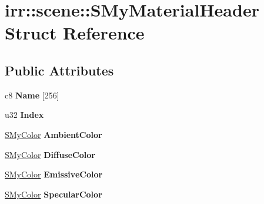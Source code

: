 \hypertarget{structirr_1_1scene_1_1_s_my_material_header}{\section{irr\-:\-:scene\-:\-:S\-My\-Material\-Header Struct Reference}
\label{structirr_1_1scene_1_1_s_my_material_header}
}
\subsection*{Public Attributes}
\begin{DoxyCompactItemize}
\item 
\hypertarget{structirr_1_1scene_1_1_s_my_material_header_a118c00037689ec6e128f6f5f6ae2c58d}{c8 {\bfseries Name} \mbox{[}256\mbox{]}}\label{structirr_1_1scene_1_1_s_my_material_header_a118c00037689ec6e128f6f5f6ae2c58d}

\item 
\hypertarget{structirr_1_1scene_1_1_s_my_material_header_aebd3865f16149fb091ae63b93d45b1d8}{u32 {\bfseries Index}}\label{structirr_1_1scene_1_1_s_my_material_header_aebd3865f16149fb091ae63b93d45b1d8}

\item 
\hypertarget{structirr_1_1scene_1_1_s_my_material_header_a217248cb0b98933ac4f79238ac8e8871}{\hyperlink{structirr_1_1scene_1_1_s_my_color}{S\-My\-Color} {\bfseries Ambient\-Color}}\label{structirr_1_1scene_1_1_s_my_material_header_a217248cb0b98933ac4f79238ac8e8871}

\item 
\hypertarget{structirr_1_1scene_1_1_s_my_material_header_a74aa495ed29826a57cb4cf760290e1b2}{\hyperlink{structirr_1_1scene_1_1_s_my_color}{S\-My\-Color} {\bfseries Diffuse\-Color}}\label{structirr_1_1scene_1_1_s_my_material_header_a74aa495ed29826a57cb4cf760290e1b2}

\item 
\hypertarget{structirr_1_1scene_1_1_s_my_material_header_a99cd82f99b837380cb5488feff04b98b}{\hyperlink{structirr_1_1scene_1_1_s_my_color}{S\-My\-Color} {\bfseries Emissive\-Color}}\label{structirr_1_1scene_1_1_s_my_material_header_a99cd82f99b837380cb5488feff04b98b}

\item 
\hypertarget{structirr_1_1scene_1_1_s_my_material_header_a1eeed8f182c5afa1020f47b50751ae5b}{\hyperlink{structirr_1_1scene_1_1_s_my_color}{S\-My\-Color} {\bfseries Specular\-Color}}\label{structirr_1_1scene_1_1_s_my_material_header_a1eeed8f182c5afa1020f47b50751ae5b}


\end{DoxyCompactItemize}

